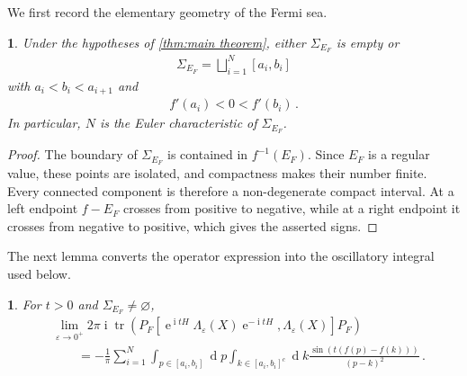 \documentclass[a4paper,10pt]{article}
\numberwithin{equation}{section}
\theoremstyle{plain}
\theoremstyle{plain}
\newtheorem{lem}[thm]{\protect\lemmaname}
\theoremstyle{plain}
\theoremstyle{plain}
\theoremstyle{plain}
\theoremstyle{remark}
\theoremstyle{definition}
\theoremstyle{plain}
\providecommand{\lemmaname}{Lemma}
\newcommand{\ee}{\operatorname{e}}
\newcommand{\ii}{\operatorname{i}}
\newcommand{\dif}{\operatorname{d}\!} %
\newcommand{\tr}{\operatorname{tr}}
\newcommand{\ve}{\varepsilon}
\newcommand{\eq}[1]{\begin{align*}#1\end{align*}}
\begin{document}
We first record the elementary geometry of the Fermi sea.

\begin{lem}\label{lem:Fermi intervals}
Under the hypotheses of \cref{thm:main theorem}, either $\Sigma_{E_F}$ is empty or
\eq{\Sigma_{E_F}=\bigsqcup_{i=1}^{N}[a_i,b_i]}
with $a_i<b_i<a_{i+1}$ and
\eq{f'(a_i)<0<f'(b_i)\,.}
In particular, $N$ is the Euler characteristic of $\Sigma_{E_F}$.
\end{lem}

\begin{proof}
The boundary of $\Sigma_{E_F}$ is contained in $f^{-1}(E_F)$. Since $E_F$ is a regular value, these points are isolated, and compactness makes their number finite. Every connected component is therefore a non-degenerate compact interval. At a left endpoint $f-E_F$ crosses from positive to negative, while at a right endpoint it crosses from negative to positive, which gives the asserted signs.
\end{proof}

The next lemma converts the operator expression into the oscillatory integral used below.

\begin{lem}\label{lem:trace formula}
For $t>0$ and $\Sigma_{E_F}\neq\varnothing$,
\eq{&\lim_{\ve\to0^+}2\pi\ii\tr\left(P_F\left[\ee^{\ii tH}\Lambda_\ve(X)\ee^{-\ii tH},\Lambda_\ve(X)\right]P_F\right)\\
&\qquad=-\frac{1}{\pi}\sum_{i=1}^{N}\int_{p\in[a_i,b_i]}\dif{p}\int_{k\in[a_i,b_i]^c}\dif{k}\frac{\sin\left(t(f(p)-f(k))\right)}{(p-k)^2}\,.}
\end{lem}
\end{document}
